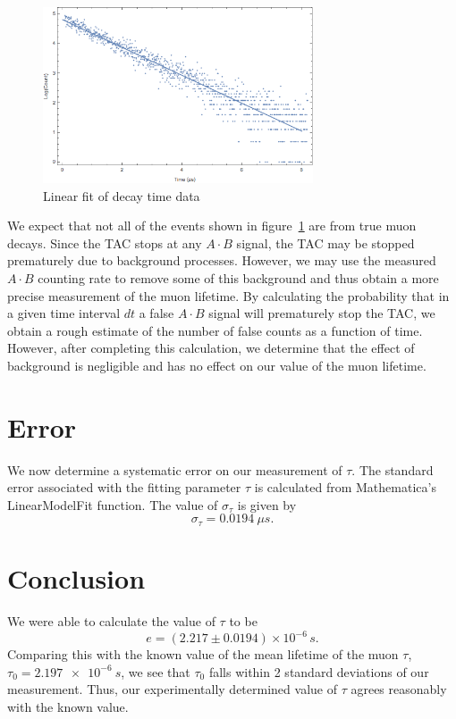 \documentclass[aps, reprint,amsmath,amssymb]{revtex4-1} %
\begin{document}
\begin{figure}
\centering
\includegraphics[width=8cm]{linearfit.png}
\caption{Linear fit of decay time data}
\label{fig:fit}
\end{figure}

We expect that not all of the events shown in figure~\ref{fig:fit} are from true muon decays. Since the TAC stops at any $A \cdot B$ signal, the TAC may be stopped prematurely due to background processes. However, we may use the measured $A \cdot B$ counting rate to remove some of this background and thus obtain a more precise measurement of the muon lifetime. By calculating the probability that in a given time interval $dt$ a false $A \cdot B$ signal will prematurely stop the TAC, we obtain a rough estimate of the number of false counts as a function of time. However, after completing this calculation, we determine that the effect of background is negligible and has no effect on our value of the muon lifetime. 

\section{Error}
We now determine a systematic error on our measurement of $\tau$. The standard error associated with the fitting parameter $\tau$ is calculated from Mathematica's LinearModelFit function. The value of $\sigma_{\tau}$ is given by
\[
	\sigma_{\tau} = \SI{0.0194}{\mu s}.
\]

\section{Conclusion}

We were able to calculate the value of $\tau$ to be
\[
    e = (2.217 \pm 0.0194) \times 10^{-6} \,\si{s}.
\]
Comparing this with the known value of the mean lifetime of the muon $\tau$, $\tau_0 = \SI{2.197e-6}{s}$, we see that $\tau_0$ falls within 2 standard deviations of our measurement.
Thus, our experimentally determined value of $\tau$ agrees reasonably with the
known value.
\end{document}
